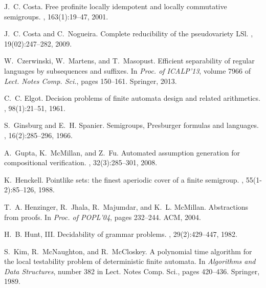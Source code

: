 \documentclass{LMCS}
\theoremstyle{plain}
\begin{document}
\begin{thebibliography}{10}
J.~C. Costa.
\newblock Free profinite locally idempotent and locally commutative semigroups.
, 163(1):19--47, 2001.

J.~C. Costa and C.~Nogueira.
\newblock Complete reducibility of the pseudovariety {LSl}.
, 19(02):247--282, 2009.

W.~Czerwinski, W.~Martens, and T.~Masopust.
\newblock Efficient separability of regular languages by subsequences and
  suffixes.
\newblock In {\em Proc. of ICALP'13}, volume 7966 of {\em Lect. Notes Comp.
  Sci.}, pages 150--161. Springer, 2013.

C.~C. Elgot.
\newblock Decision problems of finite automata design and related arithmetics.
, 98(1):21--51, 1961.

S.~Ginsburg and E.~H. Spanier.
\newblock Semigroups, {P}resburger formulas and languages.
, 16(2):285--296, 1966.

A.~Gupta, K.~McMillan, and Z.~Fu.
\newblock Automated assumption generation for compositional verification.
, 32(3):285--301, 2008.

K.~Henckell.
\newblock Pointlike sets: the finest aperiodic cover of a finite semigroup.
, 55(1-2):85--126, 1988.

T.~A. Henzinger, R.~Jhala, R.~Majumdar, and K.~L. {McMillan}.
\newblock Abstractions from proofs.
\newblock In {\em Proc. of POPL'04}, pages 232--244. {ACM}, 2004.

H.~B. Hunt, III.
\newblock Decidability of grammar problems.
, 29(2):429--447, 1982.

S.~Kim, R.~{McNaughton}, and R.~{McCloskey}.
\newblock A polynomial time algorithm for the local testability problem of
  deterministic finite automata.
\newblock In {\em Algorithms and Data Structures}, number 382 in Lect. Notes
  Comp. Sci., pages 420--436. Springer, 1989.


\end{thebibliography}
\end{document}
